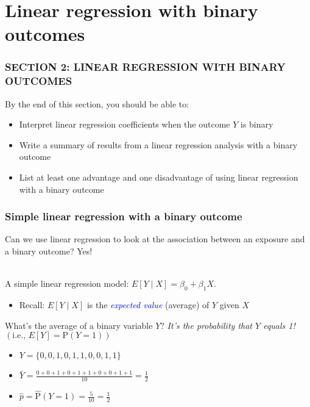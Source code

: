 \documentclass{beamer}
\begin{document}
\section{Linear regression with binary outcomes}
\begin{frame}
	\frametitle{SECTION 2: LINEAR REGRESSION WITH BINARY OUTCOMES}
	
	By the end of this section, you should be able to:
	\begin{itemize}
		\item Interpret linear regression coefficients when the outcome $Y$ is binary
		\item Write a summary of results from a linear regression analysis with a binary outcome
		\item List at least one advantage and one disadvantage of using linear regression with a binary outcome
	\end{itemize}
\end{frame}
\begin{frame}
	\frametitle{Simple linear regression with a binary outcome}
	Can we use linear regression to look at the association between an exposure and a binary outcome? Yes!
	\\ ~\
	
	A simple linear regression model: $E[Y \mid X] = \beta_0 + \beta_1 X$.
	\begin{footnotesize}
		\begin{itemize}
			\item Recall: $E[Y \mid X]$ is the \textcolor{blue}{\textit{expected value}} (average) of $Y$ given $X$ 
		\end{itemize}
	\end{footnotesize}
	\pause
	What's the average of a binary variable $Y$? \pause \textit{It's the probability that $Y$ equals 1!} $\left(\text{i.e., } E[Y] = \text{P}(Y=1)\right)$ \pause
	
	\begin{itemize} \itemsep +12pt
		\item[] $Y = \{ 0, 0, 1, 0, 1, 1, 0, 0, 1, 1 \}$ \pause
		\item[] $\bar{Y} = \frac{0 + 0 + 1 + 0 + 1 + 1 + 0 + 0 + 1 + 1}{10} = \frac{1}{2}$ \pause
		\item[] $\hat{p} = \hat{\text{P}}(Y=1) = \frac{5}{10} = \frac{1}{2} $
	\end{itemize}
\end{frame}
\end{document}
